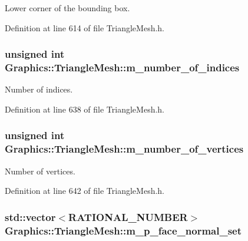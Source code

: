 Lower corner of the bounding box. 



Definition at line 614 of file TriangleMesh.h.

\hypertarget{class_graphics_1_1_triangle_mesh_ac778bb8fb96f1ab20315e02c1d46f7ae}{
\subsubsection[{m\_\-number\_\-of\_\-indices}]{\setlength{\rightskip}{0pt plus 5cm}unsigned int {\bf Graphics::TriangleMesh::m\_\-number\_\-of\_\-indices}}}
\label{class_graphics_1_1_triangle_mesh_ac778bb8fb96f1ab20315e02c1d46f7ae}


Number of indices. 



Definition at line 638 of file TriangleMesh.h.

\hypertarget{class_graphics_1_1_triangle_mesh_a655397b9815909898ea02f20a1c4a059}{
\subsubsection[{m\_\-number\_\-of\_\-vertices}]{\setlength{\rightskip}{0pt plus 5cm}unsigned int {\bf Graphics::TriangleMesh::m\_\-number\_\-of\_\-vertices}}}
\label{class_graphics_1_1_triangle_mesh_a655397b9815909898ea02f20a1c4a059}


Number of vertices. 



Definition at line 642 of file TriangleMesh.h.

\hypertarget{class_graphics_1_1_triangle_mesh_aa76c71675a25c5b58e40afcf2625f2c1}{
\subsubsection[{m\_\-p\_\-face\_\-normal\_\-set}]{\setlength{\rightskip}{0pt plus 5cm}std::vector$<${\bf RATIONAL\_\-NUMBER}$>$ {\bf Graphics::TriangleMesh::m\_\-p\_\-face\_\-normal\_\-set}}}
\label{class_graphics_1_1_triangle_mesh_aa76c71675a25c5b58e40afcf2625f2c1}


